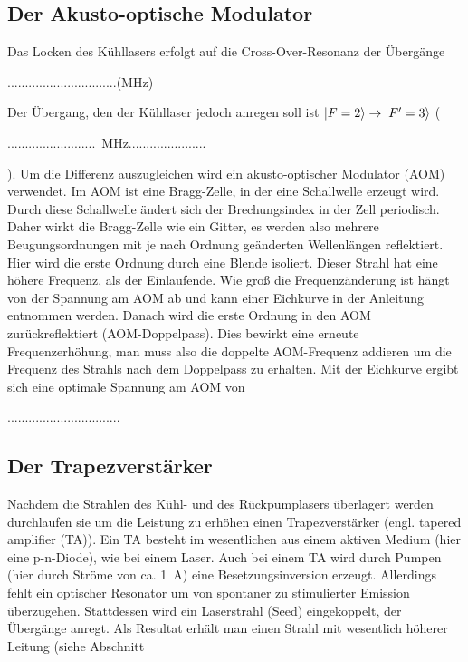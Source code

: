 \documentclass[12pt, a4paper]{article}
\begin{document}
  \subsection{Der Akusto-optische Modulator}
    Das Locken des Kühllasers erfolgt auf die Cross-Over-Resonanz der Übergänge
    
    ...............................(MHz)
    
    Der Übergang, den der Kühllaser jedoch anregen soll ist
    $\ket{F=2}\rightarrow\ket{F'=3}$ (
    
    .........................\SI{}{\MHz}......................
    
    ). Um die Differenz auszugleichen wird ein akusto-optischer Modulator (AOM)
    verwendet. Im AOM ist eine Bragg-Zelle, in der eine Schallwelle erzeugt wird. Durch
    diese Schallwelle ändert sich der Brechungsindex in der Zell periodisch. Daher
    wirkt die Bragg-Zelle wie ein Gitter, es werden also mehrere Beugungsordnungen mit
    je nach Ordnung geänderten Wellenlängen reflektiert. Hier wird die erste Ordnung
    durch eine Blende isoliert. Dieser Strahl hat eine höhere Frequenz, als der
    Einlaufende. Wie groß die Frequenzänderung ist hängt von der Spannung am AOM ab und
    kann einer Eichkurve in der Anleitung entnommen werden. Danach wird die erste
    Ordnung in den AOM zurückreflektiert (AOM-Doppelpass). Dies bewirkt eine erneute
    Frequenzerhöhung, man muss also die doppelte AOM-Frequenz addieren um die Frequenz
    des Strahls nach dem Doppelpass zu erhalten. Mit der Eichkurve ergibt sich eine
    optimale Spannung am AOM von
    
    ................................
  \subsection{Der Trapezverstärker}
    Nachdem die Strahlen des Kühl- und des Rückpumplasers überlagert werden durchlaufen
    sie um die Leistung zu erhöhen einen Trapezverstärker (engl. tapered amplifier
    (TA)). Ein TA besteht im wesentlichen aus einem aktiven Medium (hier eine
    p-n-Diode), wie bei einem Laser. Auch bei einem TA wird durch Pumpen (hier durch
    Ströme von ca. \SI{1}{\A}) eine Besetzungsinversion erzeugt. Allerdings fehlt ein
    optischer Resonator um von spontaner zu stimulierter Emission überzugehen.
    Stattdessen wird ein Laserstrahl (Seed) eingekoppelt, der Übergänge anregt. Als
    Resultat erhält man einen Strahl mit wesentlich höherer Leitung (siehe Abschnitt
    
\end{document}

